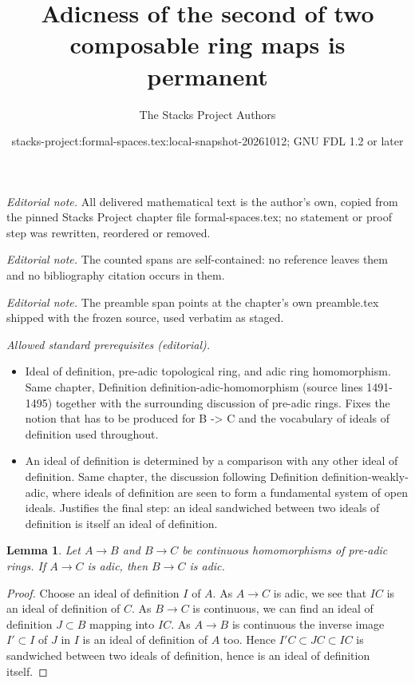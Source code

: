 \documentclass{stacks-project}
\title{Adicness of the second of two composable ring maps is permanent}
\author{The Stacks Project Authors}
\date{stacks-project:formal-spaces.tex:local-snapshot-20261012; GNU FDL 1.2 or later}
\theoremstyle{plain}
\newtheorem{lemma}[subsection]{Lemma}
\theoremstyle{definition}
\theoremstyle{remark}
\numberwithin{equation}{subsection}
\begin{document}
\maketitle
\noindent\textit{Editorial note.} All delivered mathematical text is the author's own, copied from the pinned Stacks Project chapter file formal-spaces.tex; no statement or proof step was rewritten, reordered or removed.\par\medskip
\noindent\textit{Editorial note.} The counted spans are self-contained: no reference leaves them and no bibliography citation occurs in them.\par\medskip
\noindent\textit{Editorial note.} The preamble span points at the chapter's own preamble.tex shipped with the frozen source, used verbatim as staged.\par\medskip
\noindent\textit{Allowed standard prerequisites (editorial).}\begin{itemize}
\item Ideal of definition, pre-adic topological ring, and adic ring homomorphism. Same chapter, Definition definition-adic-homomorphism (source lines 1491-1495) together with the surrounding discussion of pre-adic rings. Fixes the notion that has to be produced for B -> C and the vocabulary of ideals of definition used throughout.
\item An ideal of definition is determined by a comparison with any other ideal of definition. Same chapter, the discussion following Definition definition-weakly-adic, where ideals of definition are seen to form a fundamental system of open ideals. Justifies the final step: an ideal sandwiched between two ideals of definition is itself an ideal of definition.
\end{itemize}\medskip
\begin{lemma}
\label{lemma-permanence-adic}
Let $A \to B$ and $B \to C$ be continuous homomorphisms of
pre-adic rings. If $A \to C$ is adic, then
$B \to C$ is adic.
\end{lemma}

\begin{proof}
Choose an ideal of definition $I$ of $A$. As $A \to C$ is adic, we
see that $IC$ is an ideal of definition of $C$.
As $B \to C$ is continuous, we can find an
ideal of definition $J \subset B$ mapping into $IC$.
As $A \to B$ is continuous the inverse image $I' \subset I$
of $J$ in $I$ is an ideal of definition of $A$ too.
Hence $I'C \subset JC \subset IC$ is sandwiched between
two ideals of definition, hence is an ideal of definition itself.
\end{proof}
\end{document}
